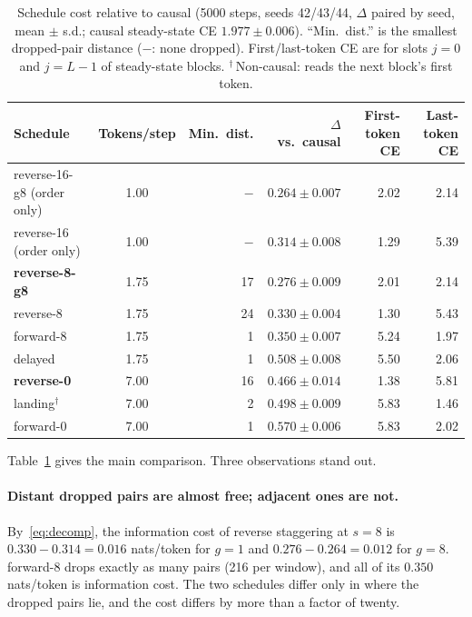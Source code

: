 \documentclass[11pt]{article}
\theoremstyle{definition}
\theoremstyle{remark}
\newcommand{\sch}[1]{\textsf{#1}}
\begin{document}
\begin{table}[t]
  \centering
  \caption{Schedule cost relative to \sch{causal} (5000 steps, seeds 42/43/44, $\Delta$ paired by seed, mean $\pm$ s.d.; causal steady-state CE $1.977\pm0.006$). ``Min.\ dist.'' is the smallest dropped-pair distance ($-$: none dropped). First/last-token CE are for slots $j=0$ and $j=L-1$ of steady-state blocks. $^\dagger$\,Non-causal: reads the next block's first token.}
  \label{tab:main}
  \small
  \begin{tabular}{lcrrrr}
    \toprule
    Schedule & Tokens/step & Min.\ dist. & $\Delta$ vs.\ causal & First-token CE & Last-token CE \\
    \midrule
    \sch{reverse-16-g8} (order only) & 1.00 & $-$ & $0.264\pm0.007$ & 2.02 & 2.14 \\
    \sch{reverse-16} (order only)    & 1.00 & $-$ & $0.314\pm0.008$ & 1.29 & 5.39 \\
    \midrule
    \textbf{\sch{reverse-8-g8}}      & 1.75 & 17 & $\mathbf{0.276\pm0.009}$ & 2.01 & 2.14 \\
    \sch{reverse-8}                  & 1.75 & 24 & $0.330\pm0.004$ & 1.30 & 5.43 \\
    \sch{forward-8}                  & 1.75 & 1  & $0.350\pm0.007$ & 5.24 & 1.97 \\
    \sch{delayed}                    & 1.75 & 1  & $0.508\pm0.008$ & 5.50 & 2.06 \\
    \midrule
    \textbf{\sch{reverse-0}}         & 7.00 & 16 & $\mathbf{0.466\pm0.014}$ & 1.38 & 5.81 \\
    \sch{landing}$^\dagger$          & 7.00 & 2  & $0.498\pm0.009$ & 5.83 & 1.46 \\
    \sch{forward-0}                  & 7.00 & 1  & $0.570\pm0.006$ & 5.83 & 2.02 \\
    \bottomrule
  \end{tabular}
\end{table}

Table~\ref{tab:main} gives the main comparison.
Three observations stand out.

\paragraph{Distant dropped pairs are almost free; adjacent ones are not.}
By~\eqref{eq:decomp}, the information cost of reverse staggering at $s=8$ is $0.330-0.314=0.016$ nats/token for $g=1$ and $0.276-0.264=0.012$ for $g=8$.
\sch{forward-8} drops exactly as many pairs (216 per window), and all of its $0.350$ nats/token is information cost.
The two schedules differ only in where the dropped pairs lie, and the cost differs by more than a factor of twenty.
\end{document}
